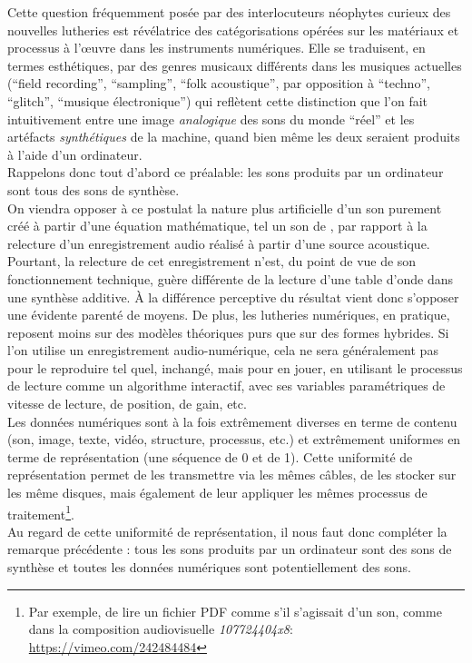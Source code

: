 \noindent {} Cette question fréquemment posée par des interlocuteurs néophytes curieux des nouvelles lutheries est révélatrice des catégorisations opérées sur les matériaux et processus à l'œuvre dans les instruments numériques. Elle se traduisent, en termes esthétiques, par des genres musicaux différents dans les musiques actuelles (``field recording'', ``sampling'', ``folk acoustique'', par opposition à ``techno'', ``glitch'', ``musique électronique'') qui reflètent cette distinction que l'on fait intuitivement entre une image \textit{analogique} des sons du monde ``réel'' et les artéfacts \textit{synthétiques} de la machine, quand bien même les deux seraient produits à l'aide d'un ordinateur.\\
\indent Rappelons donc tout d'abord ce préalable: les sons produits par un ordinateur sont tous des sons de synthèse.\\
\indent On viendra opposer à ce postulat la nature plus artificielle d'un son purement créé à partir d'une équation mathématique, tel un son de , par rapport à la relecture d'un enregistrement audio réalisé à partir d'une source acoustique. Pourtant, la relecture de cet enregistrement n'est, du point de vue de son fonctionnement technique, guère différente de la lecture d'une table d'onde dans une synthèse additive. À la différence perceptive du résultat vient donc s'opposer une évidente parenté de moyens. De plus, les lutheries numériques, en pratique, reposent moins sur des modèles théoriques purs que sur des formes hybrides. Si l'on utilise un enregistrement audio-numérique, cela ne sera généralement pas pour le reproduire tel quel, inchangé, mais pour en jouer, en utilisant le processus de lecture comme un algorithme interactif, avec ses variables paramétriques de vitesse de lecture, de position, de gain, etc.\\
\indent Les données numériques sont à la fois extrêmement diverses en terme de contenu (son, image, texte, vidéo, structure, processus, etc.) et extrêmement uniformes en terme de représentation (une séquence de 0 et de 1). Cette uniformité de représentation permet de les transmettre via les mêmes câbles, de les stocker sur les même disques, mais également de leur appliquer les mêmes processus de traitement\footnote{Par exemple, de lire un fichier PDF comme s'il s'agissait d'un son, comme dans la composition audiovisuelle \textit{107724404x8}: \url{https://vimeo.com/242484484}}.\\
\noindent Au regard de cette uniformité de représentation, il nous faut donc compléter la remarque précédente : tous les sons produits par un ordinateur sont des sons de synthèse et toutes les données numériques sont potentiellement des sons.

